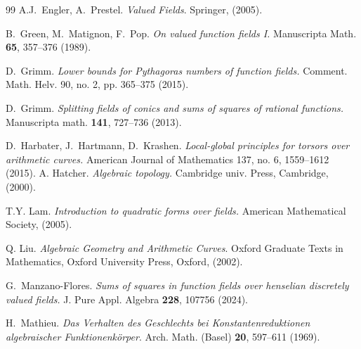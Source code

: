 \documentclass[a4paper,12pt,reqno]{amsart}
\theoremstyle{definition}
\numberwithin{equation}{thm}
\begin{document}
\begin{thebibliography}{99}
 A.J.~Engler, A.~Prestel. \textit{Valued Fields}. Springer, (2005).

B.~Green, M.~Matignon, F.~Pop. \textit{On valued function fields {I}.} Manuscripta Math. {\bf 65}, 357--376 (1989).


D.~Grimm. \textit{Lower bounds for Pythagoras numbers of function fields.} Comment. Math. Helv.
90, no. 2, pp. 365–375 (2015).


 D.~Grimm. \textit{Splitting fields of conics and sums of squares of rational functions.} Manuscripta math. {\bf 141}, 727–736 (2013).







 D.~Harbater, J.~Hartmann, D.~Krashen. \textit{Local-global principles for torsors over arithmetic curves.} American Journal of Mathematics 137, no. 6, 1559–1612 (2015).
A. Hatcher. \textit{Algebraic topology.}  Cambridge univ. Press, Cambridge, (2000).



T.Y. Lam. \textit{Introduction to quadratic forms over fields.} American
  Mathematical Society, (2005).

 Q. Liu. 
\textit{Algebraic Geometry and Arithmetic Curves}. Oxford Graduate Texts in Mathematics, Oxford University Press, Oxford, (2002).

 G.~Manzano-Flores. \textit{Sums of squares in function fields over henselian discretely valued fields.} J. Pure Appl. Algebra \textbf{228}, 107756 (2024).











H.~Mathieu. \textit{Das {V}erhalten des {G}eschlechts bei {K}onstantenreduktionen
              algebraischer {F}unktionenk\"{o}rper}. Arch. Math. (Basel) {\bf 20}, 597--611 (1969).


\end{thebibliography}
\end{document}
